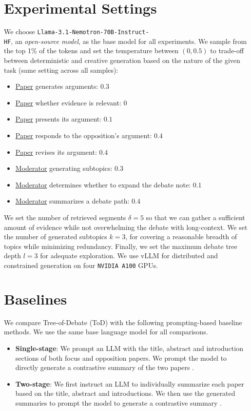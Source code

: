 \section{Experimental Settings}
\label{appendix: settings}
\par We choose \texttt{Llama-3.1-Nemotron-70B-Instruct-\\HF}, an \textit{open-source model}, as the base model for all experiments. We sample from the top 1\% of the tokens and set the temperature between $(0,0.5)$ to trade-off between deterministic and creative generation based on the nature of the given task (same setting across all samples):
\begin{itemize}
    \item \underline{Paper} generates arguments: $0.3$
    \item \underline{Paper} whether evidence is relevant: $0$
    \item \underline{Paper} presents its argument: $0.1$
    \item \underline{Paper} responds to the opposition's argument: $0.4$
    \item \underline{Paper} revises its argument: $0.4$
    \item \underline{Moderator} generating subtopics: $0.3$
    \item \underline{Moderator} determines whether to expand the debate note: $0.1$
    \item \underline{Moderator} summarizes a debate path: $0.4$
\end{itemize}

\par We set the number of retrieved segments $\delta = 5$ so that we can gather a sufficient amount of evidence while not overwhelming the debate with long-context. We set the number of generated subtopics $k = 3$, for covering a reasonable breadth of topics while minimizing redundancy. Finally, we set the maximum debate tree depth $l=3$ for adequate exploration. We use vLLM \cite{kwon2023efficient} for distributed and constrained generation on four \texttt{NVIDIA A100} GPUs.

\section{Baselines}
\label{appendix:baselines}
\par We compare Tree-of-Debate (ToD) with the following prompting-based baseline methods. 
We use the same base language model for all comparisons. 
\begin{itemize}[leftmargin=*]
    \item \textbf{Single-stage}: We prompt an LLM with the title, abstract and introduction sections of both focus and opposition papers. We prompt the model to directly generate a contrastive summary of the two papers \cite{MartinBoyle2024ShallowSO}. 
    \item \textbf{Two-stage}: We first instruct an LLM to individually summarize each paper based on the title, abstract and introductions. We then use the generated summaries to prompt the model to generate a contrastive summary \cite{Zhang2024FromCT}. 
\end{itemize}

